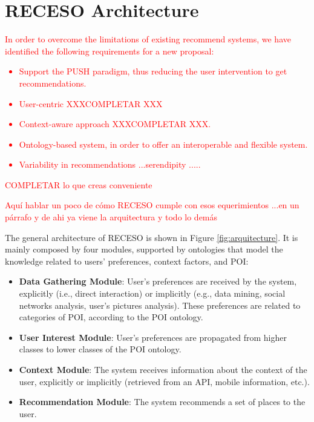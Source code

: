 \section{RECESO Architecture}
\label{sec:proposal}

\textcolor{red}{In order to overcome the limitations of existing recommend systems, we have identified the following requirements for a new proposal:
\begin{itemize}
    \item Support the PUSH paradigm, thus reducing the user intervention to get recommendations.
    \item User-centric XXXCOMPLETAR XXX
    \item Context-aware approach XXXCOMPLETAR XXX.
    \item Ontology-based system, in order to offer an interoperable and flexible  system.
    \item Variability in recommendations ...serendipity .....
\end{itemize}
COMPLETAR lo que creas conveniente
}

\textcolor{red}{Aquí hablar un poco de cómo RECESO cumple con esos equerimientos ...en un párrafo y de ahi ya viene la arquitectura y todo lo demás}

The general architecture of RECESO is shown in Figure \ref{fig:arquitecture}. It is mainly composed by four modules, supported by ontologies that model the knowledge related to users' preferences, context factors, and POI:  
\begin{itemize}
    \item \textbf{Data Gathering Module}: User's preferences are received by the system, explicitly (i.e., direct interaction) or implicitly (e.g., data mining, social networks analysis, user's pictures analysis). These preferences are related to categories of POI, according to the POI ontology. 
    \item \textbf{User Interest Module}: User's preferences are propagated from higher classes to lower classes of the POI ontology.
    \item \textbf{Context Module}: The system receives information about the context of the user, explicitly or implicitly (retrieved from an API, mobile information, etc.).
    \item \textbf{Recommendation Module}: The system recommends a set of places to the user.
\end{itemize}


